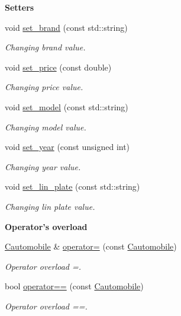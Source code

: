\begin{Indent}{\bf Setters}\par
\begin{DoxyCompactItemize}
\item 
void \hyperlink{class_cautomobile_a73eeb7e9d796dd543aed60259d86dc59}{set\+\_\+brand} (const std\+::string)
\begin{DoxyCompactList}\small\item\em Changing brand value. \end{DoxyCompactList}\item 
void \hyperlink{class_cautomobile_a9cfc42dba3baa97c66e802a17fc935cf}{set\+\_\+price} (const double)
\begin{DoxyCompactList}\small\item\em Changing price value. \end{DoxyCompactList}\item 
void \hyperlink{class_cautomobile_aff7124d509cd01e8746ec93cdc9d6184}{set\+\_\+model} (const std\+::string)
\begin{DoxyCompactList}\small\item\em Changing model value. \end{DoxyCompactList}\item 
void \hyperlink{class_cautomobile_a2c1a1e039f2f305d839782266aba7ca5}{set\+\_\+year} (const unsigned int)
\begin{DoxyCompactList}\small\item\em Changing year value. \end{DoxyCompactList}\item 
void \hyperlink{class_cautomobile_a2b1216bf9add916b0159aefba3d748f8}{set\+\_\+lin\+\_\+plate} (const std\+::string)
\begin{DoxyCompactList}\small\item\em Changing lin plate value. \end{DoxyCompactList}\end{DoxyCompactItemize}
\end{Indent}
\begin{Indent}{\bf Operator's overload}\par
\begin{DoxyCompactItemize}
\item 
\hyperlink{class_cautomobile}{Cautomobile} \& \hyperlink{class_cautomobile_af0c8b265ae26b2c051d1ff95097fe1f1}{operator=} (const \hyperlink{class_cautomobile}{Cautomobile})
\begin{DoxyCompactList}\small\item\em Operator overload =. \end{DoxyCompactList}\item 
bool \hyperlink{class_cautomobile_a999ac50ad714d2b67601c4c231657af8}{operator==} (const \hyperlink{class_cautomobile}{Cautomobile})
\begin{DoxyCompactList}\small\item\em Operator overload ==. \end{DoxyCompactList}\end{DoxyCompactItemize}
\end{Indent}


